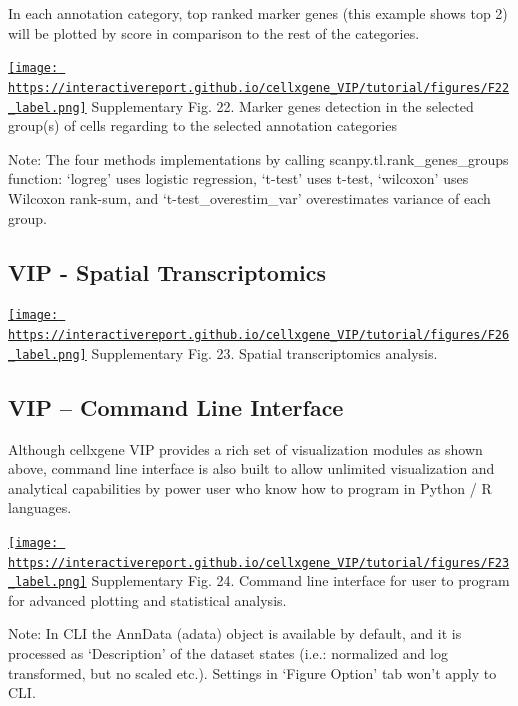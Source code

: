 \documentclass[
]{article}
\begin{document}
In each annotation category, top ranked marker genes (this example shows top 2) will be plotted by score in comparison to the rest of the categories.

\href{https://interactivereport.github.io/cellxgene_VIP/tutorial/figures/F22_label.png}{\texttt{[image: https://interactivereport.github.io/cellxgene\_VIP/tutorial/figures/F22\_label.png]}}
Supplementary Fig. 22. Marker genes detection in the selected group(s) of cells regarding to the selected annotation categories

Note: The four methods implementations by calling scanpy.tl.rank\_genes\_groups function: `logreg' uses logistic regression, `t-test' uses t-test, `wilcoxon' uses Wilcoxon rank-sum, and `t-test\_overestim\_var' overestimates variance of each group.

\hypertarget{vip---spatial-transcriptomics}{%
\subsection{VIP - Spatial Transcriptomics}\label{vip---spatial-transcriptomics}}

\href{https://interactivereport.github.io/cellxgene_VIP/tutorial/figures/F26_label.png}{\texttt{[image: https://interactivereport.github.io/cellxgene\_VIP/tutorial/figures/F26\_label.png]}}
Supplementary Fig. 23. Spatial transcriptomics analysis.

\hypertarget{vip-command-line-interface}{%
\subsection{VIP -- Command Line Interface}\label{vip-command-line-interface}}

Although cellxgene VIP provides a rich set of visualization modules as shown above, command line interface is also built to allow unlimited visualization and analytical capabilities by power user who know how to program in Python / R languages.

\href{https://interactivereport.github.io/cellxgene_VIP/tutorial/figures/F23_label.png}{\texttt{[image: https://interactivereport.github.io/cellxgene\_VIP/tutorial/figures/F23\_label.png]}}
Supplementary Fig. 24. Command line interface for user to program for advanced plotting and statistical analysis.

Note: In CLI the AnnData (adata) object is available by default, and it is processed as `Description' of the dataset states (i.e.: normalized and log transformed, but no scaled etc.). Settings in `Figure Option' tab won't apply to CLI.
\end{document}

